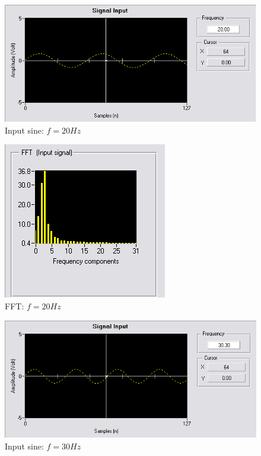 \documentclass[a4paper, 12pt, titlepage]{article}
\begin{document}
\subsubsection{}
\begin{figure}[H]
\includegraphics[scale=0.7]{input20hz.png}
\caption{Input sine: $f=20Hz$}
\end{figure}
\begin{figure}[H]
\includegraphics[scale=0.7]{FFT20hz.png}
\caption{FFT: $f=20Hz$}
\end{figure}
\begin{figure}[H]
\includegraphics[scale=0.7]{input30hz.png}
\caption{Input sine: $f=30Hz$}
\end{figure}
\end{document}
